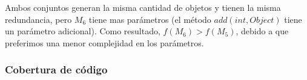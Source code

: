 Ambos conjuntos generan la misma cantidad de objetos y tienen la misma redundancia, pero \( M_6 \) tiene mas parámetros (el método \( add(int, Object) \) tiene un parámetro adicional). Como resultado, \( f(M_6) > f(M_5) \), debido a que preferimos una menor complejidad en los parámetros.









\subsubsection{Cobertura de código}
\label{sec:fitnessRandoop}


